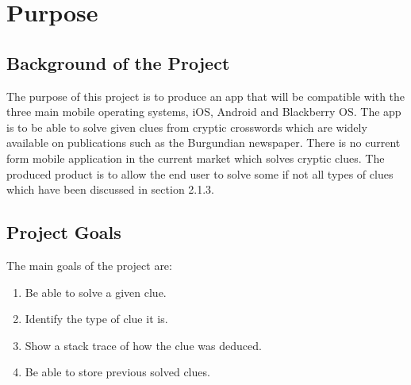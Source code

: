 \section{Purpose}

\subsection{Background of the Project}

The purpose of this project is to produce an app that will be compatible with the three main mobile operating systems, iOS, Android and Blackberry OS. The app is to be able to solve given clues from cryptic crosswords which are widely available on publications such as the Burgundian newspaper. There is no current form mobile application in the current market which solves cryptic clues. The produced product is to allow the end user to solve some if not all types of clues which have been discussed in section 2.1.3.

\subsection{Project Goals}

The main goals of the project are:

\begin{enumerate}
  \item Be able to solve a given clue.
  \item Identify the type of clue it is.
  \item Show a stack trace of how the clue was deduced.
  \item Be able to store previous solved clues. 
\end{enumerate}
